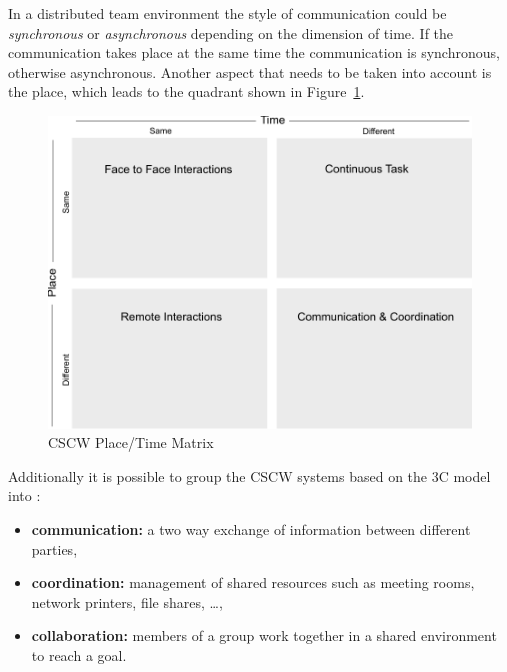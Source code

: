 In a distributed team environment the style of communication could be \emph{synchronous} or \emph{asynchronous} depending on the dimension of time. If the communication takes place at the same time the communication is synchronous, otherwise asynchronous. Another aspect that needs to be taken into account is the place, which leads to the quadrant shown in Figure~\ref{fig:images_cscw_time_place_matrix}. \@

\begin{figure}[H]
 \centering
 \includegraphics[width=0.8\columnwidth]{images/cscw_time_place_matrix.pdf}
 \caption[CSCW Place/Time Matrix]{\gls{CSCW} Place/Time Matrix \citep{xx}}
\label{fig:images_cscw_time_place_matrix}
\end{figure}

Additionally it is possible to group the CSCW systems based on the 3C model into \citep{Koch2008}:

\begin{itemize}
  \item \textbf{communication:} a two way exchange of information between different parties,
  \item \textbf{coordination:} management of shared resources such as meeting rooms, network printers, file shares, \ldots,
  \item \textbf{collaboration:} members of a group work together in a shared environment to reach a goal.
\end{itemize}


